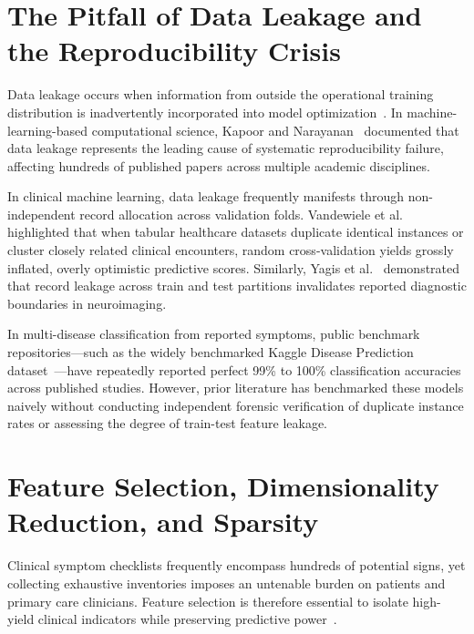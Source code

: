 \section{The Pitfall of Data Leakage and the Reproducibility Crisis}
\label{sec:data_leakage_lit}

Data leakage occurs when information from outside the operational training distribution is inadvertently incorporated into model optimization~\cite{kaufman2012leakage}. In machine-learning-based computational science, Kapoor and Narayanan~\cite{kapoor2023leakage} documented that data leakage represents the leading cause of systematic reproducibility failure, affecting hundreds of published papers across multiple academic disciplines.

In clinical machine learning, data leakage frequently manifests through non-independent record allocation across validation folds. Vandewiele et al.~\cite{vandewiele2021overly} highlighted that when tabular healthcare datasets duplicate identical instances or cluster closely related clinical encounters, random cross-validation yields grossly inflated, overly optimistic predictive scores. Similarly, Yagis et al.~\cite{yagis2021effect} demonstrated that record leakage across train and test partitions invalidates reported diagnostic boundaries in neuroimaging. 

In multi-disease classification from reported symptoms, public benchmark repositories—such as the widely benchmarked Kaggle Disease Prediction dataset~\cite{kaushil2020kaggle}—have repeatedly reported perfect 99\% to 100\% classification accuracies across published studies. However, prior literature has benchmarked these models naively without conducting independent forensic verification of duplicate instance rates or assessing the degree of train-test feature leakage.

\section{Feature Selection, Dimensionality Reduction, and Sparsity}
\label{sec:feature_selection_lit}

Clinical symptom checklists frequently encompass hundreds of potential signs, yet collecting exhaustive inventories imposes an untenable burden on patients and primary care clinicians. Feature selection is therefore essential to isolate high-yield clinical indicators while preserving predictive power~\cite{guyon2003introduction, saeys2007review}.

